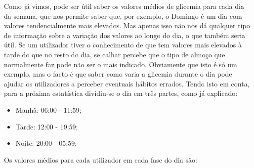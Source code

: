 Como já vimos, pode ser útil saber os valores médios de glicemia para cada dia da semana, que nos permite saber que, por exemplo, o Domingo é um dia com valores tendencialmente mais elevados. Mas apenas isso não nos dá qualquer tipo de informação sobre a variação dos valores ao longo do dia, o que também seria útil. Se um utilizador tiver o conhecimento de que tem valores mais elevados à tarde do que no resto do dia, se calhar percebe que o tipo de almoço que normalmente faz pode não ser o mais indicado. Obviamente que isto é só um exemplo, mas o facto é que saber como varia a glicemia durante o dia pode ajudar os utilizadores a perceber eventuais hábitos errados. 
Tendo isto em conta, para a próxima estatística dividiu-se o dia em três partes, como já explicado:

\begin{itemize}
\item Manhã: 06:00 - 11:59;
\item Tarde: 12:00 - 19:59;
\item Noite: 20:00 - 05:59;
\end{itemize}

Os valores médios para cada utilizador em cada fase do dia são:\newline



